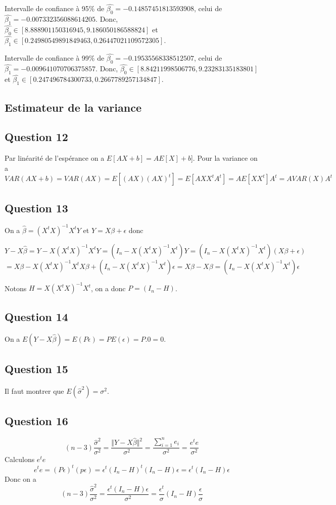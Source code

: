 \documentclass[]{book}
\theoremstyle{definition}
\begin{document}
Intervalle de confiance \`a 95\% de $\hat{\beta_0} = -0.14857451813593908$, celui de $\hat{\beta_1} = -0.007332356088614205$.  Donc, $ \hat{\beta_0} \in [8.888901150316945, 9.186050186588824]$ et $\hat{\beta_1} \in [0.24980549891849463, 0.26447021109572305]$.

Intervalle de confiance \`a 99\% de $\hat{\beta_0} = -0.19535568338512507$, celui de $\hat{\beta_1} = -0.009641070706375857$. Donc, $ \hat{\beta_0} \in [8.84211998506776, 9.23283135183801]$ et $\hat{\beta_1} \in [0.247496784300733, 0.2667789257134847]$.



\subsection*{Estimateur de la variance}
\subsection*{Question 12}
Par lin\'earit\'e de l'esp\'erance on a $E[AX+b] = AE[X] + b$]. Pour la variance on a 
$$
VAR(AX+b) = VAR(AX) = E[(AX)(AX)^t] = E[AXX^tA^t] = AE[XX^t]A^t = AVAR(X)A^t
$$

\subsection*{Question 13}
On a $\hat{\beta} = (X^tX)^{-1}X^tY$ et $Y = X\beta + \epsilon$ donc

$$Y - X\hat{\beta} = Y - X(X^tX)^{-1}X^tY = (I_n - X(X^tX)^{-1}X^t)Y = (I_n - X(X^tX)^{-1}X^t)(X\beta +\epsilon) 
$$
$$
= X\beta - X(X^tX)^{-1}X^tX\beta + (I_n-X(X^tX)^{-1}X^t)\epsilon = X\beta - X\beta = (I_n - X(X^tX)^{-1}X^t)\epsilon
$$

Notons $H = X(X^tX)^{-1}X^t$, on a donc $P = (I_n - H)$.

\subsection*{Question 14}
On a $E(Y-X\hat{\beta}) = E(P\epsilon) = PE(\epsilon) = P.0 = 0$.


\subsection*{Question 15}
Il faut montrer que $E(\hat{\sigma}^2)=\sigma^2$.


\subsection*{Question 16}
$$
(n-3)\frac{\hat{\sigma}^2}{\sigma^2} = \frac{\Vert Y - X\hat{\beta}\Vert^2}{\sigma^2} = \frac{\sum_{i=1}^{n}e_i}{\sigma^2} = \frac{e^te}{\sigma^2}
$$
Calculons $e^te$
$$
e^te = (P\epsilon)^t(p\epsilon) = \epsilon^t(I_n-H)^t(I_n - H)\epsilon = \epsilon^t(I_n - H)\epsilon
$$
Donc on a 
$$
(n-3)\frac{\hat{\sigma}^2}{\sigma^2} = \frac{\epsilon^t(I_n - H)\epsilon}{\sigma^2} = \frac{\epsilon^t}{\sigma}(I_n - H)\frac{\epsilon}{\sigma}
$$
\end{document}
